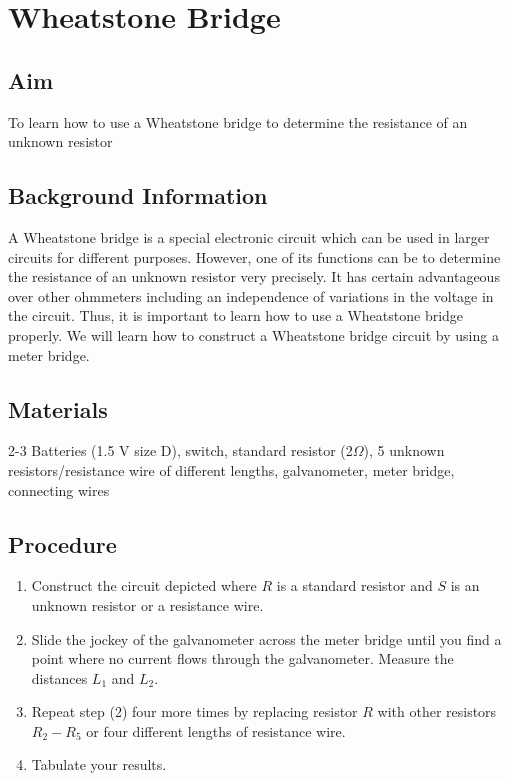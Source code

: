 \chapter{Wheatstone Bridge}

\section{Aim}
To learn how to use a Wheatstone bridge to determine the resistance of an unknown resistor

\section{Background Information}
A Wheatstone bridge is a special electronic circuit which can be used in larger circuits for different purposes. However, one of its functions can be to determine the resistance of an unknown resistor very precisely. It has certain advantageous over other ohmmeters including an independence of variations in the voltage in the circuit. Thus, it is important to learn how to use a Wheatstone bridge properly. We will learn how to construct a Wheatstone bridge circuit by using a meter bridge. 

\section{Materials}
2-3 Batteries (1.5 V size D), switch, standard resistor (2$\Omega$), 5 unknown resistors\slash resistance wire of different lengths, galvanometer, meter bridge, connecting wires

\section{Procedure}
\begin{enumerate}
\item Construct the circuit depicted where $R$ is a standard resistor and $S$ is an unknown resistor or a resistance wire. 
\item Slide the jockey of the galvanometer across the meter bridge until you find a point where no current flows through the galvanometer. Measure the distances $L_1$ and $L_2$. 
\item Repeat step (2) four more times by replacing resistor $R$ with other resistors $R_2-R_5$ or four different lengths of resistance wire.
\item Tabulate your results.
\end{enumerate}

